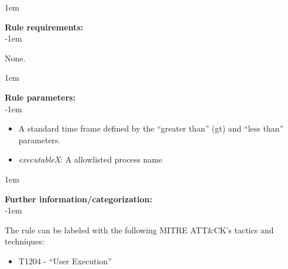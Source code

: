 \openup 1em

{\bf Rule requirements:} \\

\openup -1em
\vspace{-2em}

None.

\openup 1em

{\bf Rule parameters:} \\

\openup -1em
\vspace{-2em}

\begin{itemize}
	\item A standard time frame defined by the ``greater than'' (gt) and ``less than'' parameters.
	\item \emph{executableX}: A allowlisted process name
\end{itemize}

\openup 1em

{\bf Further information/categorization:} \\

\openup -1em
\vspace{-2em}


The rule can be labeled with the following MITRE ATT\&CK's tactics and techniques:
\begin{itemize}
	\item T1204 - ``User Execution''
\end{itemize}

\pagebreak

